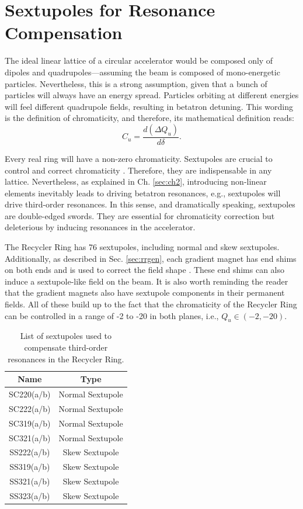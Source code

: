 \section{\label{sec:css}Sextupoles for Resonance Compensation}

The ideal linear lattice of a circular accelerator would be composed only of dipoles and quadrupoles---assuming the beam is composed of mono-energetic particles. Nevertheless, this is a strong assumption, given that a bunch of particles will always have an energy spread. Particles orbiting at different energies will feel different quadrupole fields, resulting in betatron detuning. This wording is the definition of chromaticity, and therefore, its mathematical definition reads:
\begin{equation}
   \label{eq:chrom}
   C_u=\frac{d \left( \Delta Q_u \right)}{d \delta}.
\end{equation}    

Every real ring will have a non-zero chromaticity. Sextupoles are crucial to control and correct chromaticity \cite{sylee}. Therefore, they are indispensable in any lattice. Nevertheless, as explained in Ch. \ref{sec:ch2}, introducing non-linear elements inevitably leads to driving betatron resonances, e.g., sextupoles will drive third-order resonances. In this sense, and dramatically speaking, sextupoles are double-edged swords. They are essential for chromaticity correction but deleterious by inducing resonances in the accelerator.

The Recycler Ring has 76 sextupoles, including normal and skew sextupoles. Additionally, as described in Sec. \ref{sec:rrgen}, each gradient magnet has end shims on both ends and is used to correct the field shape \cite{meiqin2}. These end shims can also induce a sextupole-like field on the beam. It is also worth reminding the reader that the gradient magnets also have sextupole components in their permanent fields. All of these build up to the fact that the chromaticity of the Recycler Ring can be controlled in a range of -2 to -20 in both planes, i.e., $Q_u\in (-2, -20)$.    

\begin{table}[H]
   \centering
   \caption{List of sextupoles used to compensate third-order resonances in the Recycler Ring.}
   \label{tab:sextscomp}
   \begin{tabular}{|c|c|}
   \hline
   \textbf{Name} & \textbf{Type}    \\ \hline
   SC220(a/b)    & Normal Sextupole \\ \hline
   SC222(a/b)    & Normal Sextupole \\ \hline
   SC319(a/b)    & Normal Sextupole \\ \hline
   SC321(a/b)    & Normal Sextupole \\ \hline
   SS222(a/b)    & Skew Sextupole   \\ \hline
   SS319(a/b)    & Skew Sextupole   \\ \hline
   SS321(a/b)    & Skew Sextupole   \\ \hline
   SS323(a/b)    & Skew Sextupole   \\ \hline
   \end{tabular}
   \end{table}

